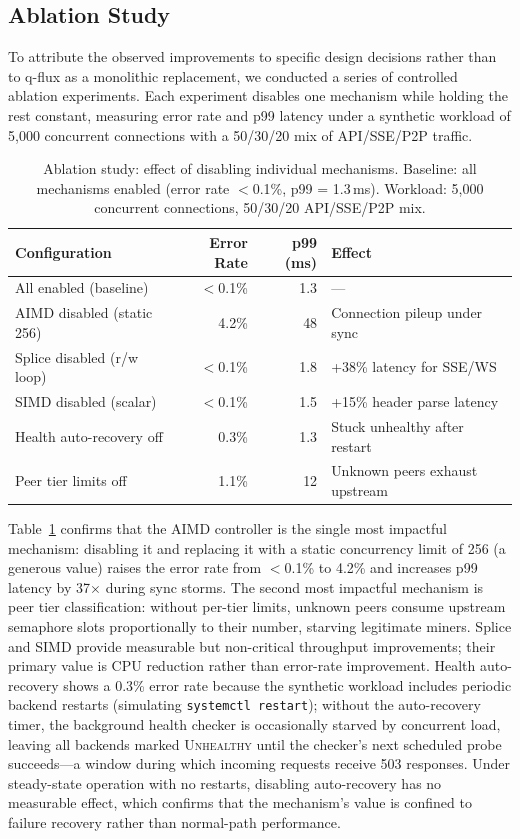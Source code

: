 \documentclass[a4paper, 11pt]{article}
\begin{document}
\subsection{Ablation Study}
\label{sec:eval-ablation}

To attribute the observed improvements to specific design decisions
rather than to q-flux as a monolithic replacement, we conducted a
series of controlled ablation experiments. Each experiment disables
one mechanism while holding the rest constant, measuring error rate
and p99 latency under a synthetic workload of 5{,}000 concurrent
connections with a 50/30/20 mix of API/SSE/P2P traffic.

\begin{table}[t]
\centering
\caption{Ablation study: effect of disabling individual mechanisms.
Baseline: all mechanisms enabled (error rate $<$0.1\%, p99 = 1.3\,ms).
Workload: 5{,}000 concurrent connections, 50/30/20 API/SSE/P2P mix.}
\label{tab:ablation}
\small
\begin{tabular}{@{}lrrl@{}}
\toprule
\textbf{Configuration} & \textbf{Error Rate} & \textbf{p99 (ms)} & \textbf{Effect} \\
\midrule
All enabled (baseline)     & $<$0.1\%  & 1.3  & --- \\
AIMD disabled (static 256) & 4.2\%     & 48   & Connection pileup under sync \\
Splice disabled (r/w loop) & $<$0.1\%  & 1.8  & +38\% latency for SSE/WS \\
SIMD disabled (scalar)     & $<$0.1\%  & 1.5  & +15\% header parse latency \\
Health auto-recovery off   & 0.3\%     & 1.3  & Stuck unhealthy after restart \\
Peer tier limits off       & 1.1\%     & 12   & Unknown peers exhaust upstream \\
\bottomrule
\end{tabular}
\end{table}

Table~\ref{tab:ablation} confirms that the AIMD controller is the
single most impactful mechanism: disabling it and replacing it with a
static concurrency limit of 256 (a generous value) raises the error
rate from $<$0.1\% to 4.2\% and increases p99 latency by 37$\times$
during sync storms. The second most impactful mechanism is peer tier
classification: without per-tier limits, unknown peers consume
upstream semaphore slots proportionally to their number, starving
legitimate miners. Splice and SIMD provide measurable but non-critical
throughput improvements; their primary value is CPU reduction rather
than error-rate improvement. Health auto-recovery shows a 0.3\% error rate because the synthetic
workload includes periodic backend restarts (simulating \texttt{systemctl
restart}); without the auto-recovery timer, the background health checker
is occasionally starved by concurrent load, leaving all backends marked
\textsc{Unhealthy} until the checker's next scheduled probe succeeds---a
window during which incoming requests receive 503 responses. Under
steady-state operation with no restarts, disabling auto-recovery has no
measurable effect, which confirms that the mechanism's value is confined
to failure recovery rather than normal-path performance.
\end{document}
